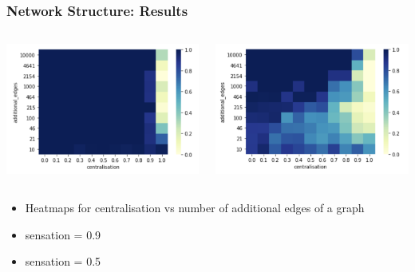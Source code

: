 \documentclass{beamer}
\begin{document}
\begin{frame}
\frametitle{Network Structure: Results}
\begin{columns}
    \begin{column}{.5\textwidth}
    \centering
    \includegraphics[width=.9\linewidth]{images/heatmap_graph_structure_09}
    \end{column}
    
    \begin{column}{.5\textwidth}
    \centering
    \includegraphics[width=.9\linewidth]{images/heatmap_graph_structure_050}
    \end{column}
\end{columns}
\begin{itemize}
    \item Heatmaps for centralisation vs number of additional edges of a graph
    \item sensation = 0.9
    \item sensation = 0.5
\end{itemize}

\end{frame}
\end{document}
